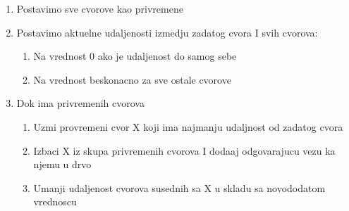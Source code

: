 \documentclass{article} %
\begin{document}
\begin{enumerate}
	\item Postavimo sve cvorove kao privremene 
	\item Postavimo aktuelne udaljenosti izmedju zadatog cvora I svih cvorova:
	\begin{enumerate}
		\item Na vrednost 0 ako je udaljenost do samog sebe
		\item Na vrednost beskonacno za sve ostale cvorove
	\end{enumerate}
	\item Dok ima privremenih cvorova
	\begin{enumerate}
		\item Uzmi provremeni cvor X koji ima najmanju udaljnost od zadatog cvora
		\item Izbaci X iz skupa privremenih cvorova I dodaaj odgovarajucu vezu ka njemu u drvo
		\item Umanji udaljenost cvorova susednih sa X u skladu sa novododatom  vrednoscu

	\end{enumerate}


\end{enumerate}
\end{document}
